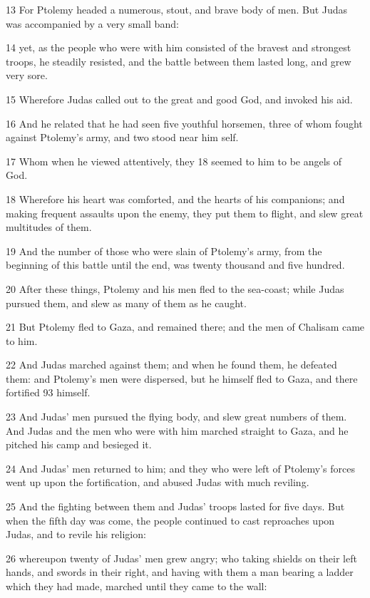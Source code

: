 13 For Ptolemy headed a numerous, stout, and brave body of men. But Judas was accompanied by a very small band: 

14 yet, as the people who were with him consisted of the bravest and strongest troops, he steadily resisted, and the battle between them lasted long, and grew very sore. 

15 Wherefore Judas called out to the great and good God, and invoked his aid. 

16 And he related that he had seen five youthful horsemen, three of whom fought against Ptolemy’s army, and two stood near him self. 

17 Whom when he viewed attentively, they 18 seemed to him to be angels of God. 

18 Wherefore his heart was comforted, and the hearts of his companions; and making frequent assaults upon the enemy, they put them to flight, and slew great multitudes of them. 

19 And the number of those who were slain of Ptolemy’s army, from the beginning of this battle until the end, was twenty thousand and five hundred. 

20 After these things, Ptolemy and his men fled to the sea-coast; while Judas pursued them, and slew as many of them as he caught. 

21 But Ptolemy fled to Gaza, and remained there; and the men of Chalisam came to him. 

22 And Judas marched against them; and when he found them, he defeated them: and Ptolemy’s men were dispersed, but he himself fled to Gaza, and there fortified 93 himself. 

23 And Judas’ men pursued the flying body, and slew great numbers of them. And Judas and the men who were with him marched straight to Gaza, and he pitched his camp and besieged it. 

24 And Judas’ men returned to him; and they who were left of Ptolemy’s forces went up upon the fortification, and abused Judas with much reviling. 

25 And the fighting between them and Judas’ troops lasted for five days. But when the fifth day was come, the people continued to cast reproaches upon Judas, and to revile his religion: 

26 whereupon twenty of Judas’ men grew angry; who taking shields on their left hands, and swords in their right, and having with them a man bearing a ladder which they had made, marched until they came to the wall: 


